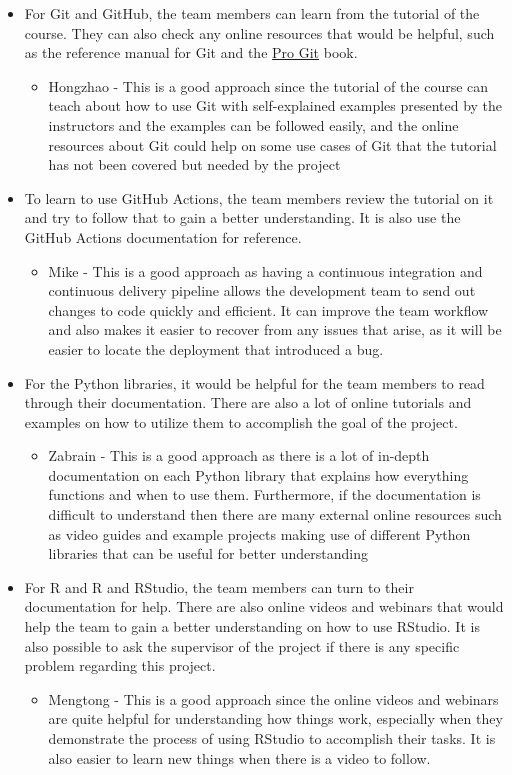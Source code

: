 \documentclass[12pt, titlepage]{article}
\begin{document}
\begin{itemize}
\begin{itemize}
    \end{itemize}
    \item For Git and GitHub, the team members can learn from the tutorial of the course. They can also check any online resources that would be helpful, such as the reference manual for Git and the \href{https://git-scm.com/book/en/v2}{Pro Git} book.
    \begin{itemize}
        \item Hongzhao - This is a good approach since the tutorial of the course can teach about how to use Git with self-explained examples presented by the instructors and the examples can be followed easily, and the online resources about Git could help on some use cases of Git that the tutorial has not been covered but needed by the project
    \end{itemize}
    \item To learn to use GitHub Actions, the team members review the tutorial on it and try to follow that to gain a better understanding. It is also use the GitHub Actions documentation for reference.
    \begin{itemize}
    \item Mike - This is a good approach as having a continuous integration and continuous delivery pipeline allows the development team to send out changes to code quickly and efficient. It can improve the team workflow and also makes it easier to recover from any issues that arise, as it will be easier to locate the deployment that introduced a bug.
    \end{itemize}
    \item For the Python libraries, it would be helpful for the team members to read through their documentation. There are also a lot of online tutorials and examples on how to utilize them to accomplish the goal of the project.
    \begin{itemize}
        \item Zabrain - This is a good approach as there is a lot of in-depth documentation on each Python library that explains how everything functions and when to use them. Furthermore, if the documentation is difficult to understand then there are many external online resources such as video guides and example projects making use of different Python libraries that can be useful for better understanding
    \end{itemize}
    \item For R and R and RStudio, the team members can turn to their documentation for help. There are also online videos and webinars that would help the team to gain a better understanding on how to use RStudio. It is also possible to ask the supervisor of the project if there is any specific problem regarding this project.
    \begin{itemize}
        \item Mengtong - This is a good approach since the online videos and webinars are quite helpful for understanding how things work, especially when they demonstrate the process of using RStudio to accomplish their tasks. It is also easier to learn new things when there is a video to follow.
    \end{itemize}


\end{itemize}
\end{document}
